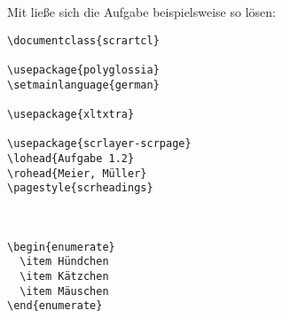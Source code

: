 % 


Mit  ließe sich die Aufgabe beispielsweise so lösen:
\begin{lstlisting}
\documentclass{scrartcl}

\usepackage{polyglossia} 
\setmainlanguage{german}

\usepackage{xltxtra}

\usepackage{scrlayer-scrpage}
\lohead{Aufgabe 1.2}
\rohead{Meier, Müller}
\pagestyle{scrheadings}



\begin{enumerate}
  \item Hündchen
  \item Kätzchen
  \item Mäuschen
\end{enumerate}


\end{lstlisting}